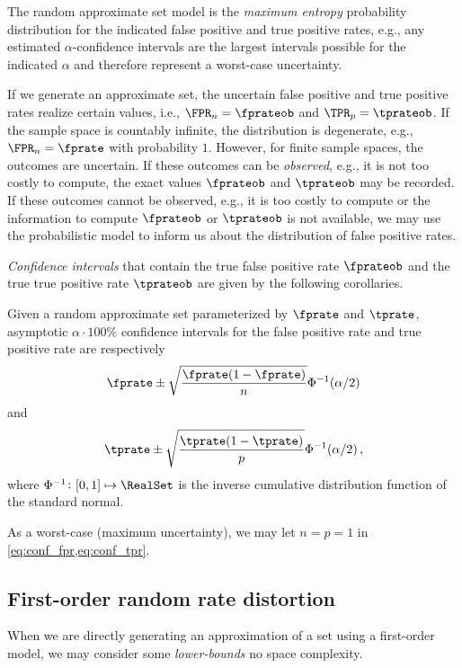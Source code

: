 \documentclass[ ../main.tex]{subfiles}
\begin{document}
The random approximate set model is the \emph{maximum entropy} probability distribution for the indicated false positive and true positive rates, e.g., any estimated $\alpha$-confidence intervals are the largest intervals possible for the indicated $\alpha$ and therefore represent a worst-case uncertainty.

If we generate an approximate set, the uncertain false positive and true positive rates realize certain values, i.e., $\FPR_n = \fprateob$ and $\TPR_p = \tprateob$.
If the sample space is countably infinite, the distribution is degenerate, e.g., $\FPR_n = \fprate$ with probability $1$. 
However, for finite sample spaces, the outcomes are uncertain.
If these outcomes can be \emph{observed}, e.g., it is not too costly to compute, the exact values $\fprateob$ and $\tprateob$ may be recorded.
If these outcomes cannot be observed, e.g., it is too costly to compute or the information to compute $\fprateob$ or $\tprateob$ is not available, we may use the probabilistic model to inform us about the distribution of false positive rates.

\emph{Confidence intervals} that contain the true false positive rate $\fprateob$ and the true true positive rate $\tprateob$ are given by the following corollaries.
\begin{theorem}
    Given a random approximate set parameterized by $\fprate$ and $\tprate$, asymptotic $\alpha \cdot 100\%$ confidence intervals for the false positive rate and true positive rate are respectively
    \begin{equation}
    \label{eq:conf_fpr}
    \fprate \pm \sqrt{\frac{\fprate(1-\fprate)}{n}} \Phi^{-1}(\alpha/2)
    \end{equation}
    and
    \begin{equation}
    \label{eq:conf_tpr}
    \tprate \pm \sqrt{\frac{\tprate(1-\tprate)}{p}} \Phi^{-1}(\alpha/2)\,,
    \end{equation}
    where $\Phi^{-1} \colon [0,1] \mapsto \RealSet$ is the inverse cumulative distribution function of the standard normal.
\end{theorem}
As a worst-case (maximum uncertainty), we may let $n = p = 1$ in \cref{eq:conf_fpr,eq:conf_tpr}.



\subsection{First-order random rate distortion}
When we are directly generating an approximation of a set using a first-order model, we may consider some \emph{lower-bounds} no space complexity.
\end{document}
